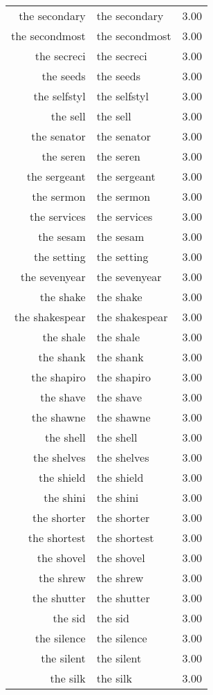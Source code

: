 \begin{table}[ht]
\begin{tabular}{rlr}
  the secondary & the secondary & 3.00 \\ 
  the secondmost & the secondmost & 3.00 \\ 
  the secreci & the secreci & 3.00 \\ 
  the seeds & the seeds & 3.00 \\ 
  the selfstyl & the selfstyl & 3.00 \\ 
  the sell & the sell & 3.00 \\ 
  the senator & the senator & 3.00 \\ 
  the seren & the seren & 3.00 \\ 
  the sergeant & the sergeant & 3.00 \\ 
  the sermon & the sermon & 3.00 \\ 
  the services & the services & 3.00 \\ 
  the sesam & the sesam & 3.00 \\ 
  the setting & the setting & 3.00 \\ 
  the sevenyear & the sevenyear & 3.00 \\ 
  the shake & the shake & 3.00 \\ 
  the shakespear & the shakespear & 3.00 \\ 
  the shale & the shale & 3.00 \\ 
  the shank & the shank & 3.00 \\ 
  the shapiro & the shapiro & 3.00 \\ 
  the shave & the shave & 3.00 \\ 
  the shawne & the shawne & 3.00 \\ 
  the shell & the shell & 3.00 \\ 
  the shelves & the shelves & 3.00 \\ 
  the shield & the shield & 3.00 \\ 
  the shini & the shini & 3.00 \\ 
  the shorter & the shorter & 3.00 \\ 
  the shortest & the shortest & 3.00 \\ 
  the shovel & the shovel & 3.00 \\ 
  the shrew & the shrew & 3.00 \\ 
  the shutter & the shutter & 3.00 \\ 
  the sid & the sid & 3.00 \\ 
  the silence & the silence & 3.00 \\ 
  the silent & the silent & 3.00 \\ 
  the silk & the silk & 3.00 \\ 

\end{tabular}
\end{table}
